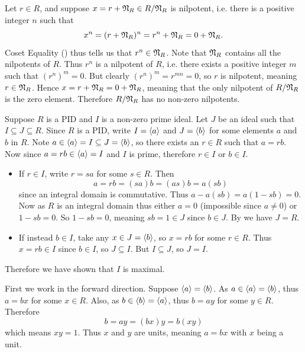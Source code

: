 \begin{questions}
    \item Let $r \in R$, and suppose $x = r + \mathfrak{N}_{R} \in R/\mathfrak{N}_{R}$ is nilpotent, i.e. there is a positive integer $n$ such that
    \[
        x^n = (r + \mathfrak{N}_{R})^n = r^n + \mathfrak{N}_{R} = 0 + \mathfrak{N}_{R}.
    \]
    Coset Equality () thus tells us that $r^n \in \mathfrak{N}_{R}$. Note that $\mathfrak{N}_{R}$ contains all the nilpotents of $R$. Thus $r^n$ is a nilpotent of $R$, i.e. there exists a positive integer $m$ such that $(r^n)^m = 0$. But clearly $(r^n)^m = r^{mn} = 0$, so $r$ is nilpotent, meaning $r \in \mathfrak{N}_{R}$. Hence $x = r + \mathfrak{N}_{R} = 0 + \mathfrak{N}_{R}$, meaning that the only nilpotent of $R/\mathfrak{N}_{R}$ is the zero element. Therefore $R/\mathfrak{N}_{R}$ has no non-zero nilpotents.

    \item Suppose $R$ is a PID and $I$ is a non-zero prime ideal. Let $J$ be an ideal such that $I \subseteq J \subseteq R$. Since $R$ is a PID, write $I = \left\langle a\right\rangle$ and $J = \left\langle b\right\rangle$ for some elements $a$ and $b$ in $R$. Note $a \in \left\langle a\right\rangle = I \subseteq J = \left\langle b\right\rangle$, so there exists an $r \in R$ such that $a = rb$. Now since $a = rb \in \left\langle a\right\rangle = I$ and $I$ is prime, therefore $r \in I$ or $b \in I$.
    \begin{itemize}
        \item If $r \in I$, write $r = sa$ for some $s \in R$. Then
        \[
            a = rb = (sa)b = (as)b = a(sb)
        \]
        since an integral domain is commutative. Thus $a - a(sb) = a(1-sb) = 0$. Now as $R$ is an integral domain thus either $a = 0$ (impossible since $a \neq 0$) or $1-sb = 0$. So $1-sb = 0$, meaning $sb = 1 \in J$ since $b \in J$. By  we have $J = R$.
        \item If instead $b \in I$, take any $x \in J = \left\langle b\right\rangle$, so $x = rb$ for some $r \in R$. Thus $x = rb \in I$ since $b \in I$, so $J \subseteq I$. But $I \subseteq J$, so $J = I$.
    \end{itemize}
    Therefore we have shown that $I$ is maximal.

    \item First we work in the forward direction. Suppose $\left\langle a\right\rangle = \left\langle b\right\rangle$. As $a \in \left\langle a\right\rangle = \left\langle b\right\rangle$, thus $a = bx$ for some $x \in R$. Also, as $b \in \left\langle b\right\rangle = \left\langle a\right\rangle$, thus $b = ay$ for some $y \in R$. Therefore
    \[
        b = ay = (bx)y = b(xy)
    \]
    which means $xy = 1$. Thus $x$ and $y$ are units, meaning $a = bx$ with $x$ being a unit.


\end{questions}

